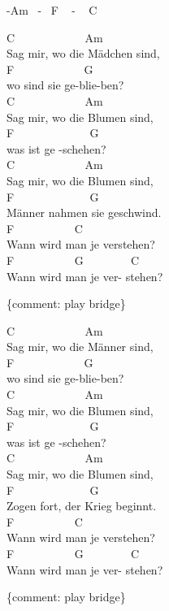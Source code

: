 \documentclass[
  letterpaper,
  twoside=false]{scrbook}
\begin{document}
-Am ~- ~F ~ - ~ C

C ~ ~ ~ ~ ~ ~ ~ Am ~ ~ ~ ~ ~\\
Sag mir, wo die Mädchen sind,\\
F ~ ~ ~ ~ ~ ~ ~ G\\
wo sind sie ge-blie-ben?\\
C ~ ~ ~ ~ ~ ~ ~ Am ~ ~ ~ ~ ~\\
Sag mir, wo die Blumen sind,\\
F ~ ~ ~ ~ ~ ~ ~ ~G\\
was ist ge -schehen?\\
C ~ ~ ~ ~ ~ ~ ~ Am ~ ~ ~ ~ ~\\
Sag mir, wo die Blumen sind,\\
F ~ ~ ~ ~ ~ ~ ~ ~G\\
Männer nahmen sie geschwind.\\
F ~ ~ ~ ~ ~ ~ C ~ ~ ~ ~ ~ ~ ~ ~\\
Wann wird man je verstehen? ~ ~\\
F ~ ~ ~ ~ ~ ~ G ~ ~ ~ ~ ~C\\
Wann wird man je ver- stehen?

\{comment: play bridge\}

C ~ ~ ~ ~ ~ ~ ~ Am ~ ~ ~ ~ ~\\
Sag mir, wo die Männer sind,\\
F ~ ~ ~ ~ ~ ~ ~ G\\
wo sind sie ge-blie-ben?\\
C ~ ~ ~ ~ ~ ~ ~ Am ~ ~ ~ ~ ~\\
Sag mir, wo die Blumen sind,\\
F ~ ~ ~ ~ ~ ~ ~ ~G\\
was ist ge -schehen?\\
C ~ ~ ~ ~ ~ ~ ~ Am ~ ~ ~ ~ ~\\
Sag mir, wo die Blumen sind,\\
F ~ ~ ~ ~ ~ ~ ~ ~G\\
Zogen fort, der Krieg beginnt.\\
F ~ ~ ~ ~ ~ ~ C ~ ~ ~ ~ ~ ~ ~ ~\\
Wann wird man je verstehen? ~ ~\\
F ~ ~ ~ ~ ~ ~ G ~ ~ ~ ~ ~C\\
Wann wird man je ver- stehen?

\{comment: play bridge\}
\end{document}
